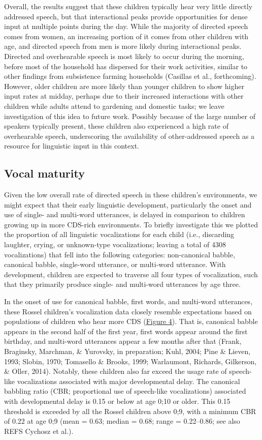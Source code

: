 \documentclass[,man,floatsintext]{apa6}
\begin{document}
Overall, the results suggest that these children typically hear very
little directly addressed speech, but that interactional peaks provide
opportunities for dense input at multiple points during the day. While
the majority of directed speech comes from women, an increasing portion
of it comes from other children with age, and directed speech from men
is more likely during interactional peaks. Directed and overhearable
speech is most likely to occur during the morning, before most of the
household has dispersed for their work activities, similar to other
findings from subsistence farming households (Casillas et al.,
forthcoming). However, older children are more likely than younger
children to show higher input rates at midday, perhaps due to their
increased interactions with other children while adults attend to
gardening and domestic tasks; we leave investigation of this idea to
future work. Possibly because of the large number of speakers typically
present, these children also experienced a high rate of overhearable
speech, underscoring the availability of other-addressed speech as a
resource for linguistic input in this context.

\subsection{Vocal maturity}\label{vocal-maturity}

Given the low overall rate of directed speech in these children's
environments, we might expect that their early linguistic development,
particularly the onset and use of single- and multi-word utterances, is
delayed in comparison to children growing up in more CDS-rich
environments. To briefly investigate this we plotted the proportion of
all linguistic vocalizations for each child (i.e., discarding laughter,
crying, or unknown-type vocalizations; leaving a total of 4308
vocalizations) that fell into the following categories: non-canonical
babble, canonical babble, single-word utterance, or multi-word
utterance. With development, children are expected to traverse all four
types of vocalization, such that they primarily produce single- and
multi-word utterances by age three.

In the onset of use for canonical babble, first words, and multi-word
utterances, these Rossel children's vocalization data closely resemble
expectations based on populations of children who hear more CDS
(\protect\hyperlink{fig4}{Figure 4}). That is, canonical babble appears
in the second half of the first year, first words appear around the
first birthday, and multi-word utterances appear a few months after that
(Frank, Braginsky, Marchman, \& Yurovsky, in preparation; Kuhl, 2004;
Pine \& Lieven, 1993; Slobin, 1970; Tomasello \& Brooks, 1999;
Warlaumont, Richards, Gilkerson, \& Oller, 2014). Notably, these
children also far exceed the usage rate of speech-like vocalizations
associated with major developmental delay. The canonical babbling ratio
(CBR; proportional use of speech-like vocalizations) associated with
developmental delay is 0.15 or below at age 0;10 or older. This 0.15
threshold is exceeded by all the Rossel children above 0;9, with a
minimum CBR of 0.22 at age 0;9 (mean = 0.63; median = 0.68; range =
0.22--0.86; see also REFS Cychosz et al.).
\end{document}
